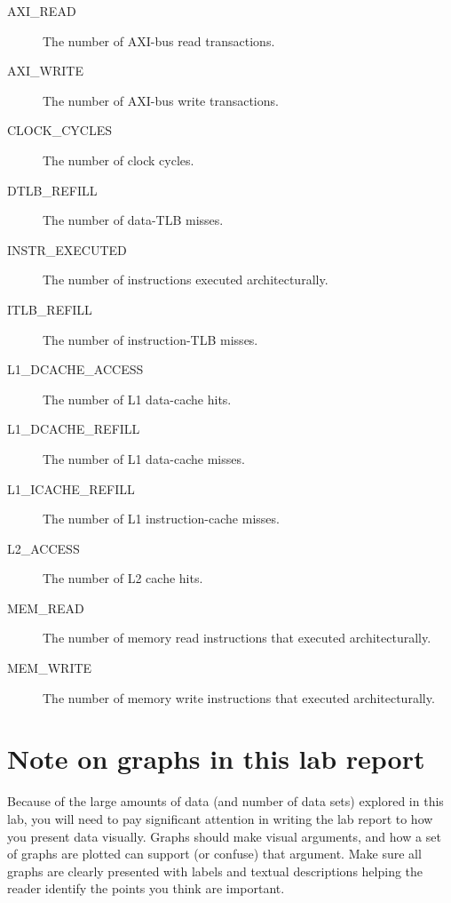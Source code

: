 \documentclass[a4paper,10pt]{article}
\begin{document}
\begin{description}

\item[AXI\_READ] The number of AXI-bus read transactions.

\item[AXI\_WRITE] The number of AXI-bus write transactions.

\item[CLOCK\_CYCLES] The number of clock cycles.

\item[DTLB\_REFILL] The number of data-TLB misses.

\item[INSTR\_EXECUTED] The number of instructions executed architecturally.

\item[ITLB\_REFILL] The number of instruction-TLB misses.

\item[L1\_DCACHE\_ACCESS] The number of L1 data-cache hits.

\item[L1\_DCACHE\_REFILL] The number of L1 data-cache misses.

\item[L1\_ICACHE\_REFILL] The number of L1 instruction-cache misses.

\item[L2\_ACCESS] The number of L2 cache hits.

\item[MEM\_READ] The number of memory read instructions that executed
  architecturally.

\item[MEM\_WRITE] The number of memory write instructions that executed
  architecturally.
\end{description}

\section*{Note on graphs in this lab report}

Because of the large amounts of data (and number of data sets) explored in
this lab, you will need to pay significant attention in writing the lab report
to how you present data visually.
Graphs should make visual arguments, and how a set of graphs are plotted can
support (or confuse) that argument.
Make sure all graphs are clearly presented with labels and textual
descriptions helping the reader identify the points you think are important.
\end{document}
